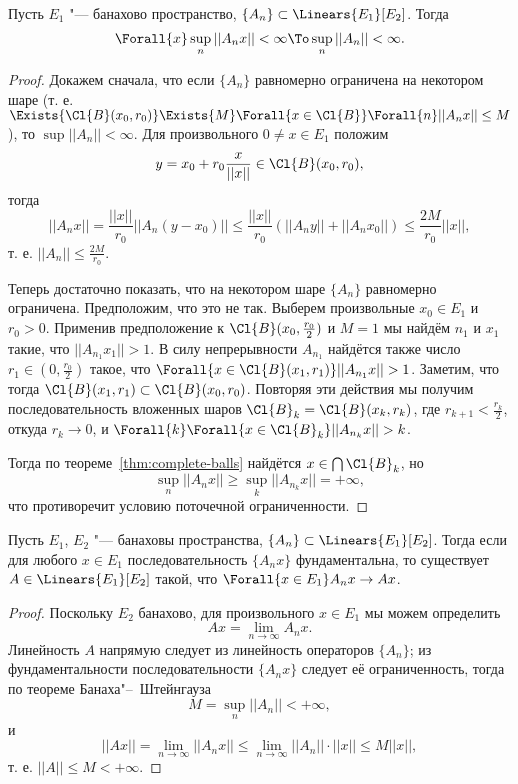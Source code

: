 \documentclass[main]{subfiles}
\begin{document}
\begin{theorem}\label{thm:operators-bsh}
  Пусть \( E_1 \) "--- банахово пространство,
  \( \{ A_n \} \subset \Linears{E_1}[E_2] \).
  Тогда
  \[
    \Forall{x} \sup_n ||A_n x || < \infty
    \To
    \sup_n ||A_n|| < \infty.
  \]
\end{theorem}
\begin{proof}
  Докажем сначала, что
  если \( \{ A_n \} \) равномерно ограничена
  на некотором шаре
  (т. е. \( \Exists{\Cl{B}(x_0, r_0)} \Exists{M}
  \Forall{x \in \Cl{B}} \Forall{n} ||A_n x|| \le M \)),
  то \( \sup ||A_n|| < \infty \).
  Для произвольного \( 0 \ne x \in E_1 \) положим
  \[
    y = x_0 + r_0 \frac{x}{||x||} \in \Cl{B}(x_0, r_0),
  \]
  тогда
  \[
    ||A_n x|| = \frac{||x||}{r_0} ||A_n (y - x_0)|| \le
    \frac{||x||}{r_0} (||A_n y|| + ||A_n x_0||) \le
    \frac{2 M}{r_0} ||x||,
  \]
  т. е. \( ||A_n|| \le \frac{2M}{r_0} \).

  Теперь достаточно показать, что на некотором
  шаре \( \{ A_n \} \) равномерно ограничена.
  Предположим, что это не так. Выберем произвольные
  \( x_0 \in E_1 \) и \( r_0 > 0 \).
  Применив предположение к \( \Cl{B}(x_0, \frac{r_0}{2}) \)
  и \( M = 1 \) мы найдём \( n_1 \) и \( x_1 \) такие,
  что \( ||A_{n_1} x_1|| > 1 \).
  В силу непрерывности \( A_{n_1} \)
  найдётся также число \( r_1 \in (0, \frac{r_0}{2}) \)
  такое, что \( \Forall{x \in \Cl{B}(x_1, r_1)} ||A_{n_1} x|| > 1 \).
  Заметим, что тогда \( \Cl{B}(x_1, r_1) \subset \Cl{B}(x_0, r_0) \).
  Повторяя эти действия мы получим последовательность
  вложенных шаров \( \Cl{B}_k = \Cl{B}(x_k, r_k) \), где
  \( r_{k + 1} < \frac{r_k}{2} \), откуда \( r_k \to 0 \),
  и \( \Forall{k} \Forall{x \in \Cl{B}_k} ||A_{n_k} x|| > k \).

  Тогда по теореме~\ref{thm:complete-balls}
  найдётся \( x \in \bigcap \Cl{B}_k \),
  но
  \[
    \sup_n ||A_n x|| \ge \sup_k ||A_{n_k} x|| = +\infty,
  \]
  что противоречит условию поточечной ограниченности.
\end{proof}

\begin{theorem}
  Пусть \( E_1 \), \( E_2 \) "--- банаховы пространства,
  \( \{ A_n \} \subset \Linears{E_1}[E_2] \).
  Тогда если для любого \( x \in E_1 \)
  последовательность \( \{ A_n x \} \) фундаментальна,
  то существует \( A \in \Linears{E_1}[E_2] \) такой,
  что \( \Forall{x \in E_1} A_n x \to A x \).
\end{theorem}
\begin{proof}
  Поскольку \( E_2 \) банахово,
  для произвольного \( x \in E_1 \)
  мы можем определить
  \[
    Ax = \lim_{n \to \infty} A_n x.
  \]
  Линейность \( A \) напрямую следует
  из линейность операторов \( \{ A_n \} \);
  из фундаментальности последовательности \( \{ A_n x \} \)
  следует её ограниченность,
  тогда по теореме Банаха"--~Штейнгауза
  \[
    M = \sup_n ||A_n|| < +\infty,
  \]
  и
  \[
    ||A x|| =
    \lim_{n \to \infty} ||A_n x|| \le
    \lim_{n \to \infty} ||A_n|| \cdot ||x|| \le
    M ||x||,
  \]
  т. е. \( ||A|| \le M < +\infty \).
\end{proof}
\end{document}
